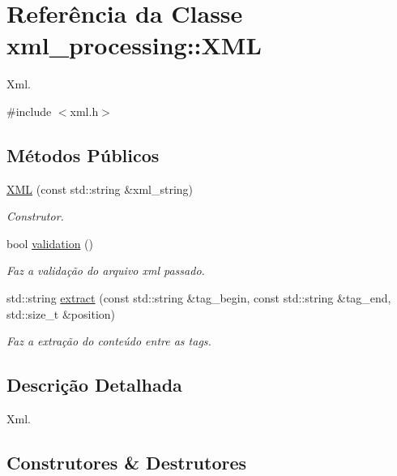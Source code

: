 \hypertarget{classxml__processing_1_1XML}{}\section{Referência da Classe xml\+\_\+processing\+:\+:X\+ML}
\label{classxml__processing_1_1XML}


Xml.  




{\ttfamily \#include $<$xml.\+h$>$}

\subsection*{Métodos Públicos}
\begin{DoxyCompactItemize}
\item 
\hyperlink{classxml__processing_1_1XML_a3abbe87e5951c3c9b9c7992f6aea79f4}{X\+ML} (const std\+::string \&xml\+\_\+string)
\begin{DoxyCompactList}\small\item\em Construtor. \end{DoxyCompactList}\item 
bool \hyperlink{classxml__processing_1_1XML_aca612f22f1eea0d502fd20423638c844}{validation} ()
\begin{DoxyCompactList}\small\item\em Faz a validação do arquivo xml passado. \end{DoxyCompactList}\item 
std\+::string \hyperlink{classxml__processing_1_1XML_a85d74f298dcdd2810838e2d1665cee6a}{extract} (const std\+::string \&tag\+\_\+begin, const std\+::string \&tag\+\_\+end, std\+::size\+\_\+t \&position)
\begin{DoxyCompactList}\small\item\em Faz a extração do conteúdo entre as tags. \end{DoxyCompactList}\end{DoxyCompactItemize}


\subsection{Descrição Detalhada}
Xml. 

\subsection{Construtores \& Destrutores}
\mbox{\label{classxml__processing_1_1XML_a3abbe87e5951c3c9b9c7992f6aea79f4}} 
